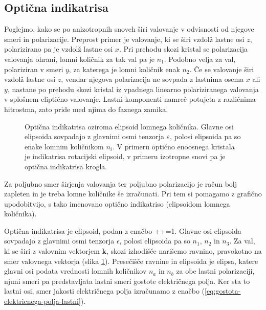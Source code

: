 \subsection*{Optična indikatrisa}
Poglejmo, kako se po anizotropnih snoveh širi valovanje v odvisnosti
od njegove smeri in polarizacije. Preprost primer je valovanje, ki se širi vzdolž lastne
osi $z$, polarizirano pa je vzdolž lastne osi $x$. Pri prehodu
skozi kristal se polarizacija valovanja ohrani, lomni količnik za
tak val pa je $n_{1}$. Podobno velja za val, polariziran v smeri
$y$, za katerega je lomni količnik enak $n_{2}$. Če se valovanje širi vzdolž lastne
osi $z$, vendar njegova polarizacija ne sovpada z lastnima osema
$x$ ali $y$, nastane po prehodu skozi kristal iz vpadnega linearno polariziranega valovanja
v splošnem eliptično valovanje. Lastni komponenti namreč potujeta z različnima
hitrostma, zato pride med njima do faznega zamika.\\
\begin{figure}[h]
\centering
\def\svgwidth{40truemm} 

\caption{\label{fig:Indikatrisa}Optična indikatrisa oziroma elipsoid lomnega količnika. Glavne osi
elipsoida sovpadajo z glavnimi osmi tenzorja $\varepsilon$, polosi elipsoida pa so enake
lomnim količnikom $n_i$. V primeru optično enoosnega kristala je indikatrisa  
rotacijski elipsoid, v primeru izotropne snovi pa je optična indikatrisa krogla. }
\end{figure}

Za poljubno smer širjenja valovanja ter poljubno polarizacijo je račun
bolj zapleten in je treba lomne količnike še izračunati. Pri tem si pomagamo 
z grafično upodobitvijo, s tako imenovano 
optično indikatriso (elipsoidom lomnega
količnika). 

Optična indikatrisa je elipsoid, podan z enačbo
\beq
{}++=1.
\eeq
Glavne osi elipsoida sovpadajo z glavnimi osmi tenzorja $\epsilon$, 
polosi elipsoida pa so $n_{1}$, $n_{2}$ in $n_{3}$. 
Za val, ki se širi z valovnim vektorjem $\mathbf{k}$, skozi izhodišče
narišemo ravnino, pravokotno na smer valovnega vektorja (slika \ref{fig:Indikatrisa}).
Presečišče ravnine in elipsoida je elipsa, katere glavni osi podata
vrednosti lomnih količnikov $n_{a}$ in $n_{b}$ za obe lastni polarizaciji,
njuni smeri pa predstavljata lastni smeri gostote električnega polja. Ker
sta to lastni osi, smer jakosti električnega polja izračunamo z
enačbo (\ref{eq:gostota-elektricnega-polja-lastni}).

